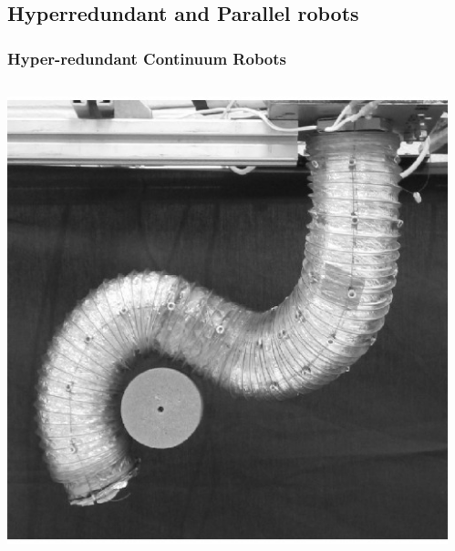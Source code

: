 \subsection{Hyperredundant and Parallel robots}
	\begin{frame}
		\frametitle{Hyper-redundant Continuum Robots}
		\begin{columns}[b]
			\begin{column}{.33\columnwidth}			
				\begin{tcolorbox}[colframe=blue!80!green, coltitle=white!80,toggle enlargement=none]
					\centering 
					\includegraphics[width=\textwidth, height=1.1\textwidth]{figures/multisec_continuum.jpg}
				\end{tcolorbox}
			\end{column}	
		\begin{column}{.33\columnwidth}			
			\begin{tcolorbox}[colframe=blue!80!green, coltitle=white!80,toggle enlargement=none]
			\centering 

\end{tcolorbox}
\end{column}
\end{columns}
\end{frame}
